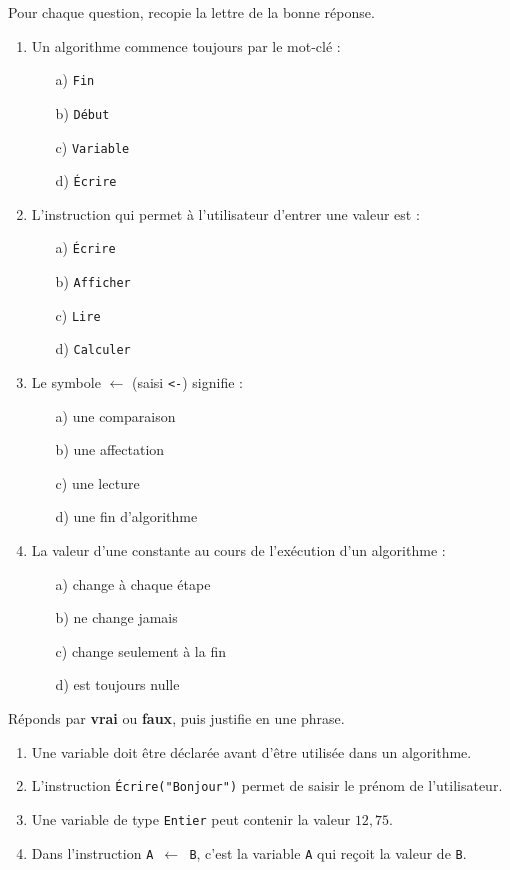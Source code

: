 \documentclass[11pt]{article}
\begin{document}
\begin{exercice}
Pour chaque question, recopie la lettre de la bonne réponse.
\begin{enumerate}
\item Un algorithme commence toujours par le mot-clé :
\begin{enumerate}
\item[a)] \texttt{Fin}
\item[b)] \texttt{Début}
\item[c)] \texttt{Variable}
\item[d)] \texttt{Écrire}
\end{enumerate}
\item L'instruction qui permet à l'utilisateur d'entrer une valeur est :
\begin{enumerate}
\item[a)] \texttt{Écrire}
\item[b)] \texttt{Afficher}
\item[c)] \texttt{Lire}
\item[d)] \texttt{Calculer}
\end{enumerate}
\item Le symbole $\leftarrow$ (saisi \texttt{<-}) signifie :
\begin{enumerate}
\item[a)] une comparaison
\item[b)] une affectation
\item[c)] une lecture
\item[d)] une fin d'algorithme
\end{enumerate}
\item La valeur d'une constante au cours de l'exécution d'un algorithme :
\begin{enumerate}
\item[a)] change à chaque étape
\item[b)] ne change jamais
\item[c)] change seulement à la fin
\item[d)] est toujours nulle
\end{enumerate}
\end{enumerate}
\end{exercice}

\begin{exercice}
Réponds par \textbf{vrai} ou \textbf{faux}, puis justifie en une phrase.
\begin{enumerate}
\item Une variable doit être déclarée avant d'être utilisée dans un algorithme.
\item L'instruction \texttt{Écrire("Bonjour")} permet de saisir le prénom de l'utilisateur.
\item Une variable de type \texttt{Entier} peut contenir la valeur $12,75$.
\item Dans l'instruction \texttt{A $\leftarrow$ B}, c'est la variable \texttt{A} qui reçoit la valeur de \texttt{B}.
\end{enumerate}
\end{exercice}
\end{document}
